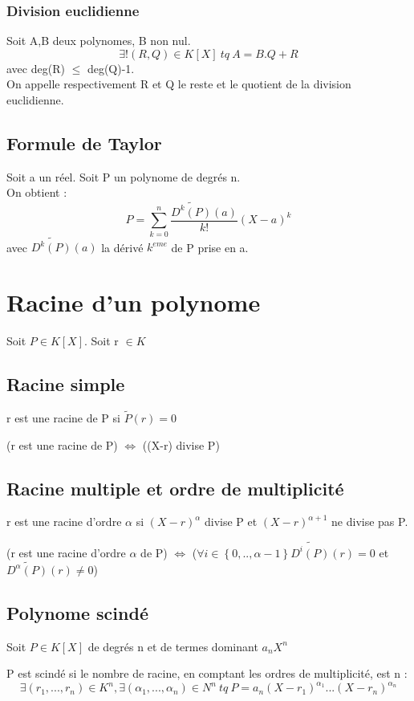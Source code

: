 \subsubsection{Division euclidienne}
\begin{de}
Soit A,B deux polynomes, B non nul.\\
$$\exists!(R,Q) \in K[X]~ tq~ A = B.Q + R$$
avec deg(R) $\leq$ deg(Q)-1.\\
On appelle respectivement R et Q le reste et le quotient de la division euclidienne.
\end{de}
\subsection{Formule de Taylor}
Soit a un réel. Soit P un polynome de degrés n.\\
On obtient :
$$P = \sum_{k=0}^n \dfrac{\widetilde{D^k(P)}(a)}{k!}(X-a)^k$$
avec $\widetilde{D^k(P)}(a)$ la dérivé $k^{eme}$ de P prise en a.
\section{Racine d'un polynome}
Soit $P \in K[X]$. Soit r $\in K$
\subsection{Racine simple}
\begin{de}
r est une racine de P si $\widetilde{P}(r) = 0$
\end{de}
\begin{prop}
(r est une racine de P) $\Leftrightarrow$ ((X-r) divise P)
\end{prop}
\subsection{Racine multiple et ordre de multiplicité}
\begin{de}
r est une racine d'ordre $\alpha$ si $(X-r)^{\alpha}$ divise P et $(X-r)^{\alpha+1}$ ne divise pas P.
\end{de}
\begin{prop}
(r est une racine d'ordre $\alpha$ de P) $\Leftrightarrow$ ($\forall i\in \left\lbrace 0,..,\alpha-1\right\rbrace \widetilde{D^i(P)}(r) = 0$ et $\widetilde{D^{\alpha}(P)}(r) \neq 0$)
\end{prop}
\subsection{Polynome scindé}
Soit $P\in K[X]$ de degrés n et de termes dominant $a_nX^n$
\begin{de}
P est scindé si le nombre de racine, en comptant les ordres de multiplicité, est n : $$\exists(r_1,...,r_n)\in K^n, \exists(\alpha_1,...,\alpha_n) \in N^n~ tq~ P = a_n(X-r_1)^{\alpha_1}...(X-r_n)^{\alpha_n}$$
\end{de}
